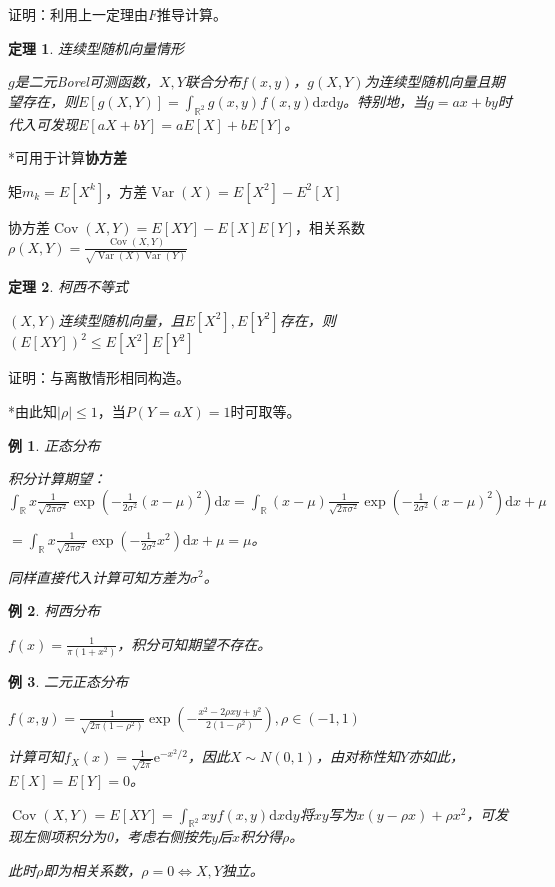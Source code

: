 \documentclass[a4paper,UTF8,fontset=windows]{ctexart}
\newtheorem{thm}{定理}[section]
\newtheorem{exmp}{例}[section]
\DeclareMathOperator{\Cov}{Cov}
\DeclareMathOperator{\Var}{Var}
\begin{document}
证明：利用上一定理由$F$推导计算。

\begin{thm} 连续型随机向量情形

$g$是二元Borel可测函数，$X,Y$联合分布$f(x,y)$，$g(X,Y)$为连续型随机向量且期望存在，则$E[g(X,Y)]=\int_{\mathbb{R}^2}g(x,y)f(x,y)\mathrm{d}x\mathrm{d}y$。特别地，当$g=ax+by$时代入可发现$E[aX+bY]=aE[X]+bE[Y]$。
\end{thm}

*可用于计算\textbf{协方差}

矩$m_k=E[X^k]$，方差$\Var(X)=E[X^2]-E^2[X]$

协方差$\Cov(X,Y)=E[XY]-E[X]E[Y]$，相关系数$\rho(X,Y)=\frac{\Cov(X,Y)}{\sqrt{\Var(X)\Var(Y)}}$

\begin{thm} 柯西不等式

$(X,Y)$连续型随机向量，且$E[X^2],E[Y^2]$存在，则$(E[XY])^2\le E[X^2]E[Y^2]$
\end{thm}

证明：与离散情形相同构造。

*由此知$|\rho|\le1$，当$P(Y=aX)=1$时可取等。

\begin{exmp} 正态分布

积分计算期望：$\int_\mathbb{R}x\frac{1}{\sqrt{2\pi\sigma^2}}\exp\left(-\frac{1}{2\sigma^2}(x-\mu)^2\right)\mathrm{d}x=\int_\mathbb{R}(x-\mu)\frac{1}{\sqrt{2\pi\sigma^2}}\exp\left(-\frac{1}{2\sigma^2}(x-\mu)^2\right)\mathrm{d}x+\mu$

$=\int_\mathbb{R}x\frac{1}{\sqrt{2\pi\sigma^2}}\exp\left(-\frac{1}{2\sigma^2}x^2\right)\mathrm{d}x+\mu=\mu$。

同样直接代入计算可知方差为$\sigma^2$。
\end{exmp}

\begin{exmp} 柯西分布

$f(x)=\frac{1}{\pi(1+x^2)}$，积分可知期望不存在。
\end{exmp}

\begin{exmp} 二元正态分布

$f(x,y)=\frac{1}{\sqrt{2\pi(1-\rho^2)}}\exp\left(-\frac{x^2-2\rho xy+y^2}{2(1-\rho^2)}\right),\rho\in(-1,1)$

计算可知$f_X(x)=\frac{1}{\sqrt{2\pi}}\mathrm{e}^{-x^2/2}$，因此$X\sim N(0,1)$，由对称性知$Y$亦如此，$E[X]=E[Y]=0$。

$\Cov(X,Y)=E[XY]=\int_{\mathbb{R}^2}xyf(x,y)\mathrm{d}x\mathrm{d}y$将$xy$写为$x(y-\rho x)+\rho x^2$，可发现左侧项积分为0，考虑右侧按先$y$后$x$积分得$\rho$。

此时$\rho$即为相关系数，$\rho=0\Leftrightarrow X,Y$独立。
\end{exmp}
\end{document}
